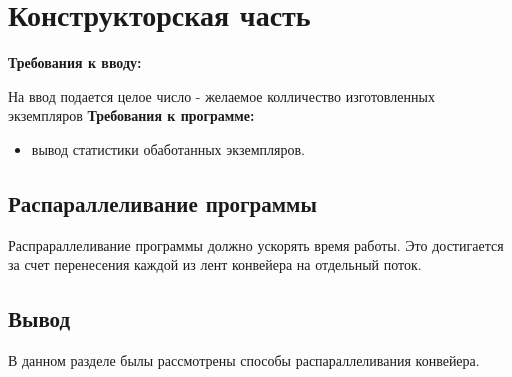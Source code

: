 \chapter{Конструкторская часть}

\noindent\textbf{Требования к вводу:}

На ввод подается целое число - желаемое колличество изготовленных экземпляров
\newline
\textbf{Требования к программе:}
\begin{itemize}
	\item вывод статистики обаботанных экземпляров.
\end{itemize}

\section{Распараллеливание программы}
Распрараллеливание программы должно ускорять время работы. Это достигается за счет перенесения каждой из лент конвейера на отдельный поток.

\section*{Вывод}

В данном разделе былы рассмотрены способы распараллеливания конвейера.

